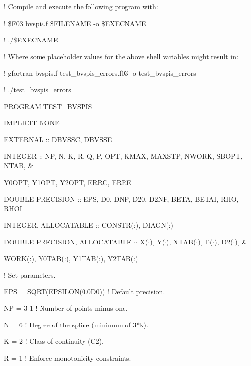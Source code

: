 {\parskip=0pt \parindent=10pt \ttVIII
\item{} \textMaroon ! Compile and execute the following program with: \textBlack
\item{} \textMaroon ! \$F03 bvspis.f \$FILENAME -o \$EXECNAME \textBlack
\item{} \textMaroon ! ./\$EXECNAME \textBlack
\item{} \textMaroon ! Where some placeholder values for the above shell variables might result in: \textBlack
\item{} \textMaroon ! gfortran bvspis.f test\_bvspis\_errors.f03 -o test\_bvspis\_errors \textBlack
\item{} \textMaroon ! ./test\_bvspis\_errors \textBlack
\item{} \textCyan PROGRAM \textBlue TEST\_BVSPIS \textBlack
\item{}   \textCyan IMPLICIT \textGreen NONE\textBlack
\item{}   \textCyan EXTERNAL \textBlack :: \textBlue DBVSSC\textBlack, \textBlue DBVSSE\textBlack
\item{}   \textGreen INTEGER \textBlack :: NP, N, K, R, Q, P, OPT, KMAX, MAXSTP, NWORK, SBOPT, NTAB, \textCyan\&\textBlack $ $
\item{}   \hskip 10mm Y0OPT, Y1OPT, Y2OPT, ERRC, ERRE
\item{}   \textGreen DOUBLE PRECISION \textBlack :: EPS, D0, DNP, D20, D2NP, BETA, BETAI, RHO, RHOI
\item{}   \textGreen INTEGER\textBlack, \textCyan ALLOCATABLE \textBlack :: CONSTR(:), DIAGN(:) 
\item{}   \textGreen DOUBLE PRECISION\textBlack, \textCyan ALLOCATABLE \textBlack :: X(:), Y(:), XTAB(:), D(:), D2(:), \textCyan\&\textBlack $ $
\item{}   \hskip 10mm WORK(:), Y0TAB(:), Y1TAB(:), Y2TAB(:)
\item{}   \textMaroon ! Set parameters. \textBlack
\item{}   EPS = \textCyan SQRT\textBlack(\textCyan EPSILON\textBlack(0.0D0)) \textMaroon ! Default precision. \textBlack
\item{}   NP = 3-1 \textMaroon ! Number of points minus one. \textBlack
\item{}   N = 6 \textMaroon ! Degree of the spline (minimum of 3*k). \textBlack
\item{}   K = 2 \textMaroon ! Class of continuity (C2). \textBlack
\item{}   R = 1 \textMaroon ! Enforce monotonicity constraints. \textBlack
}
